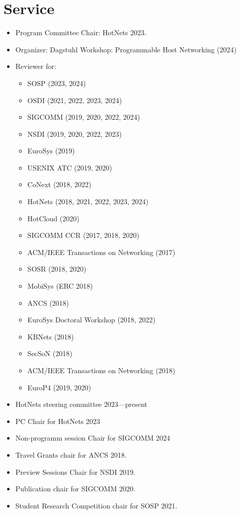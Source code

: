 \documentclass[11pt,letterpaper,sans]{moderncv}        %
\begin{document}
\section{Service}
    \begin{itemize}
        \item Program Committee Chair: HotNets 2023.
        \item Organizer: Dagstuhl Workshop: Programmable Host Networking
            (2024)
        \item Reviewer for:
            \begin{itemize}
                \item SOSP (2023, 2024)
                \item OSDI (2021, 2022, 2023, 2024)
                \item SIGCOMM (2019, 2020, 2022, 2024)
                \item NSDI (2019, 2020, 2022, 2023)
                \item EuroSys (2019)
                \item USENIX ATC (2019, 2020)
                \item CoNext (2018, 2022)
                \item HotNets (2018, 2021, 2022, 2023, 2024)
                \item HotCloud (2020)
                \item SIGCOMM CCR (2017, 2018, 2020)
                \item ACM/IEEE Transactions on Networking (2017)
                \item SOSR (2018, 2020)
                \item MobiSys (ERC 2018)
                \item ANCS (2018)
                \item EuroSys Doctoral Workshop (2018, 2022)
                \item KBNets (2018)
                \item SecSoN (2018)
                \item ACM/IEEE Transactions on Networking (2018)
                \item EuroP4 (2019, 2020)
            \end{itemize}
        \item HotNets steering committee 2023---present
        \item PC Chair for HotNets 2023
        \item Non-programm session Chair for SIGCOMM 2024
        \item Travel Grants chair for ANCS 2018.
        \item Preview Sessions Chair for NSDI 2019.
        \item Publication chair for SIGCOMM 2020. 
        \item Student Research Competition chair for SOSP 2021. 
    \end{itemize}
\end{document}
